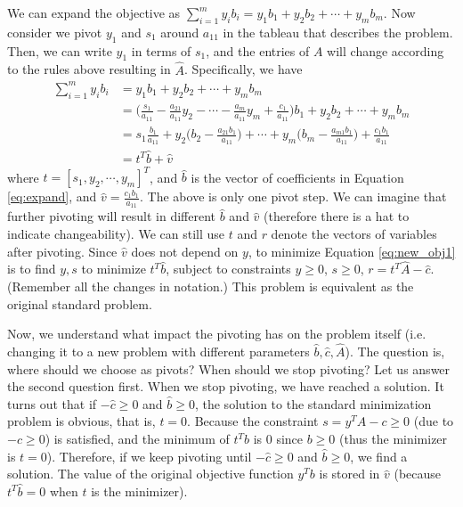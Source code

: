 \documentclass[12pt]{article}
\begin{document}
We can expand the objective as $\sum_{i=1}^my_ib_i=y_1b_1+y_2b_2+\cdots+y_mb_m$. Now consider we pivot $y_1$ and $s_1$ around $a_{11}$ in the tableau that describes the problem. Then, we can write $y_1$ in terms of $s_1$, and the entries of $A$ will change according to the rules above resulting in $\hat{A}$. Specifically, we have
\begin{align}
  \sum_{i=1}^my_ib_i&=y_1b_1+y_2b_2+\cdots+y_mb_m\\
  &=\Big(\frac{s_1}{a_{11}}-\frac{a_{21}}{a_{11}}y_2-\cdots-\frac{a_m}{a_{11}}y_m+\frac{c_1}{a_{11}}\Big)b_1+y_2b_2+\cdots+y_mb_m\\
  \label{eq:expand}&=s_1\frac{b_1}{a_{11}}+y_2\Big(b_2-\frac{a_{21}b_1}{a_{11}}\Big)+\cdots+y_m\Big(b_m-\frac{a_{m1}b_1}{a_{11}}\Big)+\frac{c_1b_1}{a_{11}}\\
  \label{eq:new_obj1}&=t^T\hat{b}+\hat{v}
\end{align}
where $t=[s_1, y_2, \cdots, y_m]^T$, and $\hat{b}$ is the vector of coefficients in Equation \ref{eq:expand}, and $\hat{v}=\frac{c_1b_1}{a_{11}}$. The above is only one pivot step. We can imagine that further pivoting will result in different $\hat{b}$ and $\hat{v}$ (therefore there is a hat to indicate changeability). We can still use $t$ and $r$ denote the vectors of variables after pivoting. Since $\hat{v}$ does not depend on $y$, to minimize Equation \ref{eq:new_obj1} is to find $y, s$ to minimize $t^T\hat{b}$, subject to constraints $y\geq 0$, $s\geq 0$, $r=t^T\hat{A}-\hat{c}$. (Remember all the changes in notation.) This problem is equivalent as the original standard problem.

Now, we understand what impact the pivoting has on the problem itself (i.e. changing it to a new problem with different parameters $\hat{b}, \hat{c}, \hat{A}$). The question is, where should we choose as pivots? When should we stop pivoting? Let us answer the second question first. When we stop pivoting, we have reached a solution. It turns out that if $-\hat{c}\geq 0$ and $\hat{b}\geq 0$, the solution to the standard minimization problem is obvious, that is, $t=0$. Because the constraint $s=y^TA-c\geq 0$ (due to $-c\geq 0$) is satisfied, and the minimum of $t^Tb$ is 0 since $b\geq 0$ (thus the minimizer is $t=0$). Therefore, if we keep pivoting until $-\hat{c}\geq 0$ and $\hat{b}\geq 0$, we find a solution. The value of the original objective function $y^Tb$ is stored in $\hat{v}$ (because $t^T\hat{b}=0$ when $t$ is the minimizer).
\end{document}
